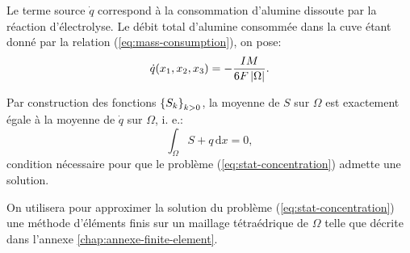 Le terme source $\dot q$ correspond à la consommation d'alumine
dissoute par la réaction d'électrolyse. Le débit total d'alumine
consommée dans la cuve étant donné par la relation
(\ref{eq:mass-consumption}), on pose:
\begin{equation}
  \dot q(x_1, x_2, x_3) = -\frac{IM}{6F\left\lvert \Omega \right\rvert}.
\end{equation}

\begin{remarque}
  Par construction des fonctions $\left\{ S_k \right\}_{k>0}$, la moyenne de $S$ sur
  $\Omega$ est exactement égale à la moyenne de $\dot q$ sur
  $\Omega$, i. e.:
  \begin{equation}
    \int_\Omega S + q\,\mathrm dx = 0,
  \end{equation}
  condition nécessaire pour que le problème
  (\ref{eq:stat-concentration}) admette une solution.
\end{remarque}

On utilisera pour approximer la solution du problème
(\ref{eq:stat-concentration}) une méthode d'éléments finis sur
un maillage tétraédrique de $\Omega$ telle que décrite dans
l'annexe \ref{chap:annexe-finite-element}.
